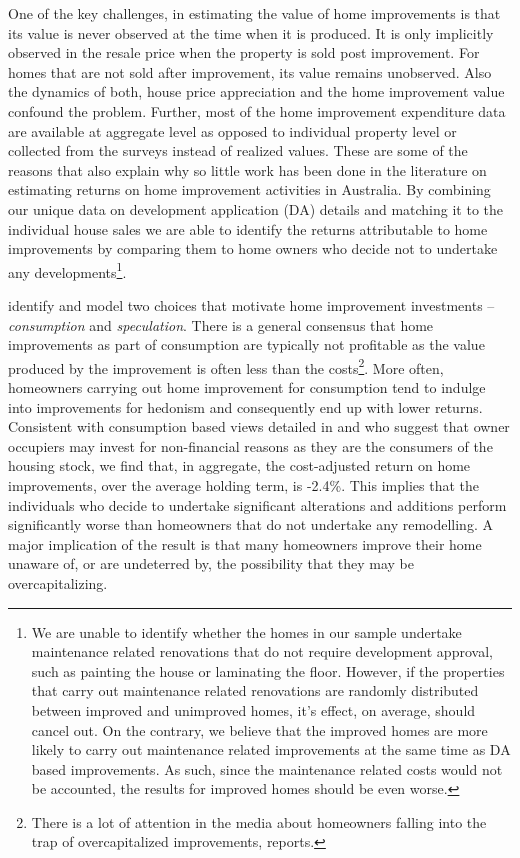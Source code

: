 \documentclass[AEJ,reqno, draftmode]{AEA} %
\begin{document}
One of the key challenges, in estimating the value of home improvements is that its value is never observed at the time when it is produced. It is only implicitly observed in the resale price when the property is sold post improvement. For homes that are not sold after improvement, its value remains unobserved. Also the dynamics of both, house price appreciation and the home improvement value confound the problem. Further, most of the home improvement expenditure data are available at aggregate level as opposed to individual property level or collected from the surveys instead of realized values. These are some of the reasons that also explain why so little work has been done in the literature on estimating returns on home improvement activities in Australia. By combining our unique data on development application (DA) details and matching it to the individual house sales we are able to identify the returns attributable to home improvements by comparing them to home owners who decide not to undertake any developments\footnote{We are unable to identify whether the homes in our sample undertake maintenance related renovations that do not require development approval, such as painting the house or laminating the floor. However, if the properties that carry out maintenance related renovations are randomly distributed between improved and unimproved homes, it's effect, on average, should cancel out. On the contrary, we believe that the improved homes are more likely to carry out maintenance related improvements at the same time as DA based improvements. As such, since the maintenance related costs would not be accounted, the results for improved homes should be even worse.}.

\citet{choi2014speculating} identify and model two choices that motivate home improvement investments -- \textit{consumption} and \textit{speculation}. There is a general consensus that home improvements as part of consumption are typically not profitable as the value produced by the improvement is often less than the costs\footnote{There is a lot of attention in the media about homeowners falling into the trap of overcapitalized improvements, \citet{newsarticleovercapital} reports.}. More often, homeowners carrying out home improvement for consumption tend to indulge into improvements for hedonism and consequently end up with lower returns. Consistent with consumption based views detailed in \citet{choi2014speculating} and \citet{gyourko2004reinvestment} who suggest that owner occupiers may invest for non-financial reasons as they are the consumers of the housing stock, we find that, in aggregate, the cost-adjusted return on home improvements, over the average holding term, is -2.4\%. This implies that the individuals who decide to undertake significant alterations and additions perform significantly worse than homeowners that do not undertake any remodelling.  A major implication of the result is that many homeowners improve their home unaware of, or are undeterred by, the possibility that they may be overcapitalizing.
\end{document}
